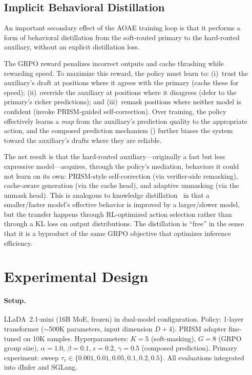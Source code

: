 \documentclass[11pt]{article}
\begin{document}
\subsection{Implicit Behavioral Distillation}
\label{sec:distillation}

An important secondary effect of the AOAE training loop is that it performs a form of behavioral distillation from the soft-routed primary to the hard-routed auxiliary, without an explicit distillation loss.

The GRPO reward penalizes incorrect outputs and cache thrashing while rewarding speed.
To maximize this reward, the policy must learn to: (i)~trust the auxiliary's draft at positions where it agrees with the primary (cache these for speed); (ii)~override the auxiliary at positions where it disagrees (defer to the primary's richer predictions); and (iii)~remask positions where neither model is confident (invoke PRISM-guided self-correction).
Over training, the policy effectively learns a \emph{map} from the auxiliary's prediction quality to the appropriate action, and the composed prediction mechanism () further biases the system toward the auxiliary's drafts where they are reliable.

The net result is that the hard-routed auxiliary---originally a fast but less expressive model---acquires, through the policy's mediation, behaviors it could not learn on its own: PRISM-style self-correction (via verifier-side remasking), cache-aware generation (via the cache head), and adaptive unmasking (via the unmask head).
This is analogous to knowledge distillation~\cite{hinton2015distilling} in that a smaller/faster model's effective behavior is improved by a larger/slower model, but the transfer happens through RL-optimized action selection rather than through a KL loss on output distributions.
The distillation is ``free'' in the sense that it is a byproduct of the same GRPO objective that optimizes inference efficiency.

\section{Experimental Design}
\label{sec:experiments}

\paragraph{Setup.}
LLaDA~2.1-mini (16B MoE, frozen) in dual-model configuration.
Policy: 1-layer transformer (${\sim}$500K parameters, input dimension $D{+}4$).
PRISM adapter fine-tuned on 10K samples.
Hyperparameters: $K{=}5$ (soft-masking), $G{=}8$ (GRPO group size), $\alpha{=}1.0$, $\beta{=}0.1$, $\epsilon{=}0.2$, $\gamma{=}0.5$ (composed prediction).
Primary experiment: sweep $\tau_r \in \{0.001, 0.01, 0.05, 0.1, 0.2, 0.5\}$.
All evaluations integrated into dInfer and SGLang.
\end{document}
